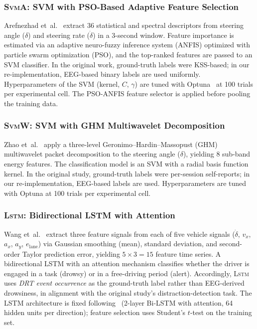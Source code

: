 \documentclass[lettersize,journal]{IEEEtran}
\newcommand{\Impl}[1]{\textsc{#1}}
\begin{document}
\subsubsection{\Impl{SvmA}: SVM with PSO-Based Adaptive Feature Selection}
Arefnezhad et~al.~\cite{arefnezhad2019} extract 36 statistical and spectral descriptors from steering angle ($\delta$) and steering rate ($\dot{\delta}$) in a 3-second window.
Feature importance is estimated via an adaptive neuro-fuzzy inference system (ANFIS) optimized with particle swarm optimization (PSO), and the top-ranked features are passed to an SVM classifier.
In the original work, ground-truth labels were KSS-based; in our re-implementation, EEG-based binary labels are used uniformly.
Hyperparameters of the SVM (kernel, $C$, $\gamma$) are tuned with Optuna~\cite{akiba2019} at 100 trials per experimental cell.
The PSO-ANFIS feature selector is applied before pooling the training data.

\subsubsection{\Impl{SvmW}: SVM with GHM Multiwavelet Decomposition}
Zhao et~al.~\cite{zhao2012} apply a three-level Geronimo--Hardin--Massopust (GHM) multiwavelet packet decomposition to the steering angle ($\delta$), yielding 8 sub-band energy features.
The classification model is an SVM with a radial basis function kernel.
In the original study, ground-truth labels were per-session self-reports; in our re-implementation, EEG-based labels are used.
Hyperparameters are tuned with Optuna at 100 trials per experimental cell.

\subsubsection{\Impl{Lstm}: Bidirectional LSTM with Attention}
Wang et~al.~\cite{wang2022} extract three feature signals from each of five vehicle signals ($\dot{\delta}$, $v_x$, $a_x$, $a_y$, $e_{\text{lane}}$) via Gaussian smoothing (mean), standard deviation, and second-order Taylor prediction error, yielding $5 \times 3 = 15$ feature time series.
A bidirectional LSTM with an attention mechanism classifies whether the driver is engaged in a task (drowsy) or in a free-driving period (alert).
Accordingly, \Impl{Lstm} uses \emph{DRT event occurrence} as the ground-truth label rather than EEG-derived drowsiness, in alignment with the original study's distraction-detection task.
The LSTM architecture is fixed following~\cite{nakagama2025iv} (2-layer Bi-LSTM with attention, 64 hidden units per direction); feature selection uses Student's $t$-test on the training set.
\end{document}

